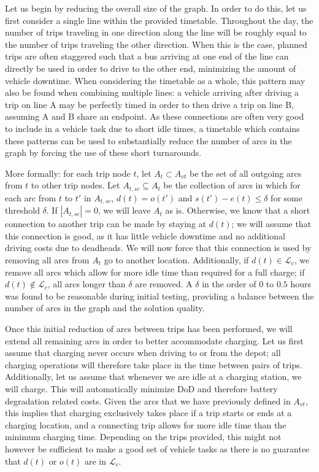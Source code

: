 \documentclass[]{article}
\begin{document}
Let us begin by reducing the overall size of the graph. In order to do this, let us first consider a single line within the provided timetable. Throughout the day, the number of trips traveling in one direction along the line will be roughly equal to the number of trips traveling the other direction. When this is the case, planned trips are often staggered such that a bus arriving at one end of the line can directly be used in order to drive to the other end, minimizing the amount of vehicle downtime. When considering the timetable as a whole, this pattern may also be found when combining multiple lines: a vehicle arriving after driving a trip on line A may be perfectly timed in order to then drive a trip on line B, assuming A and B share an endpoint. As these connections are often very good to include in a vehicle task due to short idle times, a timetable which contains these patterns can be used to substantially reduce the number of arcs in the graph by forcing the use of these short turnarounds. 

More formally: for each trip node $t$, let $A_t \subset A_{vt}$ be the set of all outgoing arcs from $t$ to other trip nodes. Let $A_{t,sc} \subseteq A_t$ be the collection of arcs in which for each arc from $t$ to $t'$ in $A_{t,sc}$, $d(t) = o(t')$ and $s(t') - e(t) \leq \delta$ for some threshold $\delta$. If $|A_{t,sc}| = 0$, we will leave $A_t$ as is. Otherwise, we know that a short connection to another trip can be made by staying at $d(t)$; we will assume that this connection is good, as it has little vehicle downtime and no additional driving costs due to deadheads. We will now force that this connection is used by removing all arcs from $A_t$ go to another location. Additionally, if $d(t) \in \mathcal{L}_c$, we remove all arcs which allow for more idle time than required for a full charge; if $d(t) \not\in \mathcal{L}_c$, all arcs longer than $\delta$ are removed. A $\delta$ in the order of $0$ to $0.5$ hours was found to be reasonable during initial testing, providing a balance between the number of arcs in the graph and the solution quality.

Once this initial reduction of arcs between trips has been performed, we will extend all remaining arcs in order to better accommodate charging. Let us first assume that charging never occurs when driving to or from the depot; all charging operations will therefore take place in the time between pairs of trips. Additionally, let us assume that whenever we are idle at a charging station, we will charge. This will automatically minimize DoD and therefore battery degradation related costs. Given the arcs that we have previously defined in $A_{vt}$, this implies that charging exclusively takes place if a trip starts or ends at a charging location, and a connecting trip allows for more idle time than the minimum charging time. Depending on the trips provided, this might not however be sufficient to make a good set of vehicle tasks as there is no guarantee that $d(t)$ or $o(t)$ are in $\mathcal{L}_c$.
\end{document}
